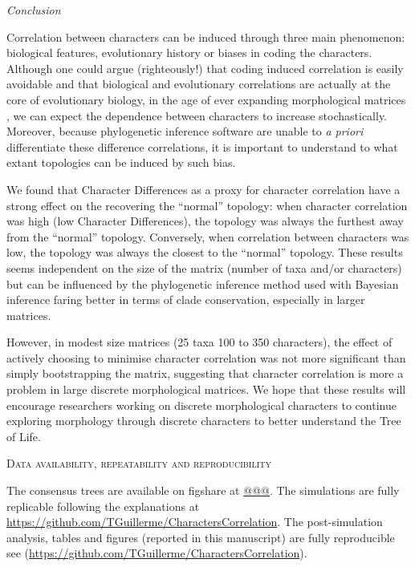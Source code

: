 \documentclass[12pt,letterpaper]{article}
\renewcommand{\section}[1]{%
\bigskip
\begin{center}
\begin{Large}
\normalfont\scshape #1
\medskip
\end{Large}
\end{center}}
\renewcommand{\subsection}[1]{%
\bigskip
\begin{center}
\begin{large}
\normalfont\itshape #1
\end{large}
\end{center}}
\begin{document}
\subsection{Conclusion}
Correlation between characters can be induced through three main phenomenon: biological features, evolutionary history or biases in coding the characters.
Although one could argue (righteously!) that coding induced correlation is easily avoidable and that biological and evolutionary correlations are actually at the core of evolutionary biology, in the age of ever expanding morphological matrices \citep[e.g.][with more than 1000 characters each]{nithe2013,O'Leary08022013}, we can expect the dependence between characters to increase stochastically.
Moreover, because phylogenetic inference software are unable to \textit{a priori} differentiate these difference correlations, it is important to understand to what extant topologies can be induced by such bias.

We found that Character Differences as a proxy for character correlation have a strong effect on the recovering the ``normal'' topology: when character correlation was high (low Character Differences), the topology was always the furthest away from the ``normal'' topology.
Conversely, when correlation between characters was low, the topology was always the closest to the ``normal'' topology.
These results seems independent on the size of the matrix (number of taxa and/or characters) but can be influenced by the phylogenetic inference method used with Bayesian inference faring better in terms of clade conservation, especially in larger matrices.

However, in modest size matrices (25 taxa 100 to 350 characters), the effect of actively choosing to minimise character correlation was not more significant than simply bootstrapping the matrix, suggesting that character correlation is more a problem in large discrete morphological matrices.
We hope that these results will encourage researchers working on discrete morphological characters to continue exploring morphology through discrete characters to better understand the Tree of Life.

\section{Data availability, repeatability and reproducibility}
The consensus trees are available on figshare at \url{@@@}.
The simulations are fully replicable following the explanations at \url{https://github.com/TGuillerme/CharactersCorrelation}.
The post-simulation analysis, tables and figures (reported in this manuscript) are fully reproducible see (\url{https://github.com/TGuillerme/CharactersCorrelation}).
\end{document}
